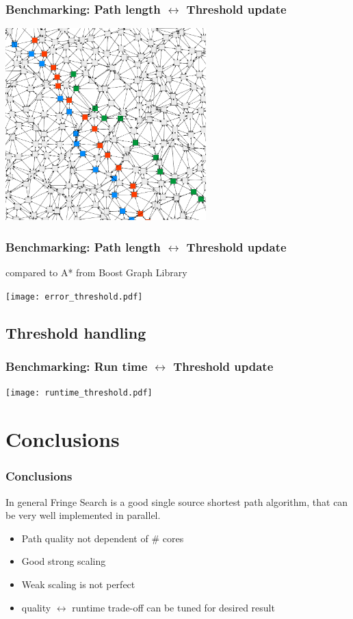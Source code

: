 \documentclass{beamer}
\begin{document}
\begin{frame}
\frametitle{Benchmarking: Path length $\leftrightarrow$ Threshold update}
\begin{center}
	\includegraphics[height=210pt]{path_close.png}
\end{center}
\end{frame}


\begin{frame}
\frametitle{Benchmarking: Path length $\leftrightarrow$ Threshold update}
compared to A* from Boost Graph Library
\begin{center}
	\texttt{[image: error\_threshold.pdf]}
\end{center}
\end{frame}

\subsection{Threshold handling}
\begin{frame}
\frametitle{Benchmarking: Run time $\leftrightarrow$ Threshold update}
\begin{center}
	\texttt{[image: runtime\_threshold.pdf]}
\end{center}
\end{frame}

\section{Conclusions}
\begin{frame}
\frametitle{Conclusions}
In general Fringe Search is a good single source shortest path algorithm, that can be very well implemented in parallel.\\
\begin{itemize}
\item Path quality not dependent of \# cores
\item Good strong scaling
\item Weak scaling is not perfect
\item quality $\leftrightarrow$ runtime trade-off can be tuned for desired result
\end{itemize}
\end{frame}
\end{document}
